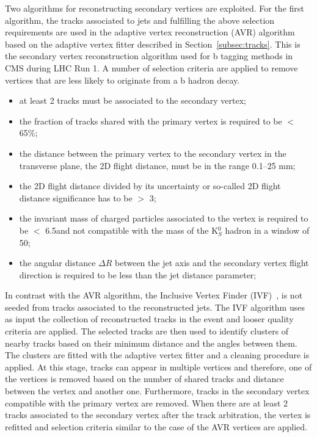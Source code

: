 Two algorithms for reconstructing secondary vertices are exploited. For the first algorithm, the tracks associated to jets and fulfilling the above selection requirements are used in the adaptive vertex reconstruction (AVR) algorithm~\cite{Waltenberger:1166320} based on the adaptive vertex fitter described in Section~\ref{subsec:tracks}. This is the secondary vertex reconstruction algorithm used for b tagging methods in CMS during LHC Run 1. A number of selection criteria are applied to remove vertices that are less likely to originate from a b hadron decay. 

\begin{itemize}
\item at least 2 tracks must be associated to the secondary vertex;
\item the fraction of tracks shared with the primary vertex is required to be $<$ 65\%;
\item the distance between the primary vertex to the secondary vertex in the transverse plane, the 2D flight distance, must be in the range 0.1--25 mm;
\item the 2D flight distance divided by its uncertainty or so-called 2D flight distance significance has to be $>$ 3;
\item the invariant mass of charged particles associated to the vertex is required to be $<$ 6.5\GeV and not compatible with the mass of the K$^0_S$ hadron in a window of 50\MeV;
\item the angular distance $\Delta R$ between the jet axis and the secondary vertex flight direction is required to be less than the jet distance parameter;
\end{itemize}

In contrast with the AVR algorithm, the Inclusive Vertex Finder (IVF)~\cite{Khachatryan:2011wq}, is not seeded from tracks associated to the reconstructed jets. The IVF algorithm uses as input the collection of reconstructed tracks in the event and looser quality criteria are applied. The selected tracks are then used to identify clusters of nearby tracks based on their minimum distance and the angles between them. The clusters are fitted with the adaptive vertex fitter and a cleaning procedure is applied. At this stage, tracks can appear in multiple vertices and therefore, one of the vertices is removed based on the number of shared tracks and distance between the vertex and another one. Furthermore, tracks in the secondary vertex compatible with the primary vertex are removed. When there are at least 2 tracks associated to the secondary vertex after the track arbitration, the vertex is refitted and selection criteria similar to the case of the AVR vertices are applied.

